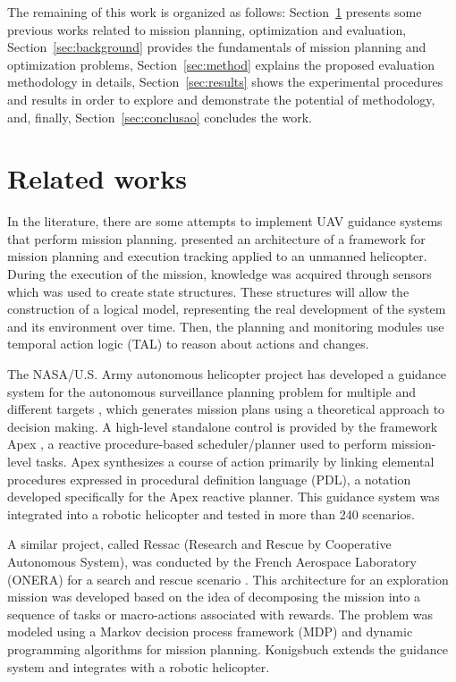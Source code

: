 \documentclass[conference,harvard,brazil,english]{sbatex}
\begin{document}
The remaining of this work is organized as follows: Section~\ref{sec:related} presents some previous works related to mission planning, optimization and evaluation, Section~\ref{sec:background} provides the fundamentals of mission planning and optimization problems, Section~\ref{sec:method} explains the proposed evaluation methodology in details, Section~\ref{sec:results} shows the experimental procedures and results in order to explore and demonstrate the potential of methodology, and, finally, Section~\ref{sec:conclusao} concludes the work.

\section{Related works}
\label{sec:related}

In the literature, there are some attempts to implement UAV guidance systems that perform mission planning.  presented an architecture of a framework for mission planning and execution tracking applied to an unmanned helicopter. During the execution of the mission, knowledge was acquired through sensors which was used to create state structures. These structures will allow the construction of a logical model, representing the real development of the system and its environment over time. Then, the planning and monitoring modules use temporal action logic (TAL) to reason about actions and changes.

The NASA/U.S. Army autonomous helicopter project has developed a guidance system for the autonomous surveillance planning problem for multiple and different targets \cite{whalley2005design}, which generates mission plans using a theoretical approach to decision making. A high-level standalone control is provided by the framework Apex \cite{baer1998nasa}, a reactive procedure-based scheduler/planner used to perform mission-level tasks. Apex synthesizes a course of action primarily by linking elemental procedures expressed in procedural definition language (PDL), a notation developed specifically for the Apex reactive planner. This guidance system was integrated into a robotic helicopter and tested in more than 240 scenarios.

A similar project, called Ressac (Research and Rescue by Cooperative Autonomous System), was conducted by the French Aerospace Laboratory (ONERA) for a search and rescue scenario \cite{fabiani2007autonomous}. This architecture for an exploration mission was developed based on the idea of decomposing the mission into a sequence of tasks or macro-actions associated with rewards. The problem was modeled using a Markov decision process framework (MDP) and dynamic programming algorithms for mission planning. Konigsbuch \cite{teichteil2007multi} extends the guidance system and integrates with a robotic helicopter.
\end{document}
